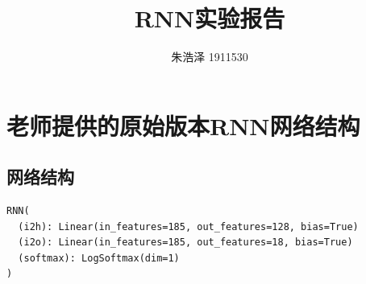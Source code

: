 \documentclass{article}
\begin{document}
\title{RNN实验报告}
\author{朱浩泽 1911530}
\maketitle
\large
\section{老师提供的原始版本RNN网络结构}
\subsection{网络结构}
\begin{lstlisting}
RNN(
  (i2h): Linear(in_features=185, out_features=128, bias=True)
  (i2o): Linear(in_features=185, out_features=18, bias=True)
  (softmax): LogSoftmax(dim=1)
)
\end{lstlisting}
\end{document}

